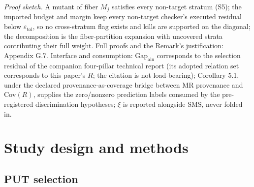 \documentclass[manuscript,screen,review]{acmart}
\begin{document}
\emph{Proof sketch.} A mutant of fiber $M_j$ satisfies every non-target
stratum (S5); the imported budget and margin keep every non-target
checker's executed residual below $\varepsilon_{\mathrm{tol}}$, so no
cross-stratum flag exists and kills are supported on the diagonal; the
decomposition is the fiber-partition expansion with uncovered strata
contributing their full weight. Full proofs and the Remark's
justification: Appendix G.7. Interface and consumption:
$\mathrm{Gap}_{\mathrm{aln}}$ corresponds to the selection residual of
the companion four-pillar technical report (its adopted relation set
corresponds to this paper's $R$; the citation is not load-bearing);
Corollary 5.1, under the declared provenance-as-coverage bridge between
MR provenance and $\mathrm{Cov}(R)$, supplies the zero/nonzero
prediction labels consumed by the pre-registered discrimination
hypotheses; $\xi$ is reported alongside SMS, never folded in.


\section{Study design and methods}\label{experimental-subjects-and-operator-framework}

\subsection{PUT selection}\label{put-selection-12-puts-4-classes}
\end{document}
